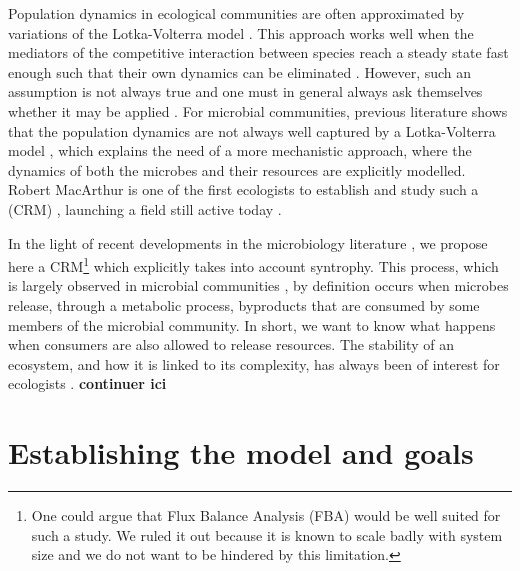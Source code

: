 \documentclass[12pt, titlepage]{report}
\begin{document}
Population dynamics in ecological communities are often approximated by variations of the Lotka-Volterra model \cite{lotka_analytical_1920}. This approach works well when the mediators of the competitive interaction between species reach a steady state fast enough such that their own dynamics can be eliminated \cite{momeni_lotka-volterra_2017}. However, such an assumption is not always true and one must in general always ask themselves whether it may be applied \cite{odwyer_whence_2018}. For microbial communities, previous literature shows that the population dynamics are not always well captured by a Lotka-Volterra model \cite{momeni_lotka-volterra_2017}, which explains the need of a more mechanistic approach, where the dynamics of both the microbes and their resources are explicitly modelled. Robert MacArthur is one of the first ecologists to establish and study such a  (CRM) \cite{macarthur_species_1970}, launching a field still active today \cite{brunner_metabolite_2019}.

In the light of recent developments in the microbiology literature \cite{morris_microbial_2013}, we propose here a CRM\footnote{One could argue that Flux Balance Analysis (FBA) \cite{orth_what_2010} would be well suited for such a study. We ruled it out because it is known to scale badly \cite{thiele_multiscale_2012} with system size and we do not want to be hindered by this limitation.} which explicitly takes into account syntrophy. This process, which is largely observed in microbial communities \cite{morris_microbial_2013}, by definition occurs when microbes release, through a metabolic process, byproducts that are consumed by some members of the microbial community. In short, we want to know what happens when consumers are also allowed to release resources. The stability of an ecosystem, and how it is linked to its complexity, has always been of interest for ecologists \cite{landi_complexity_2018}. \textbf{continuer ici}

\section{Establishing the model and goals}
\end{document}
